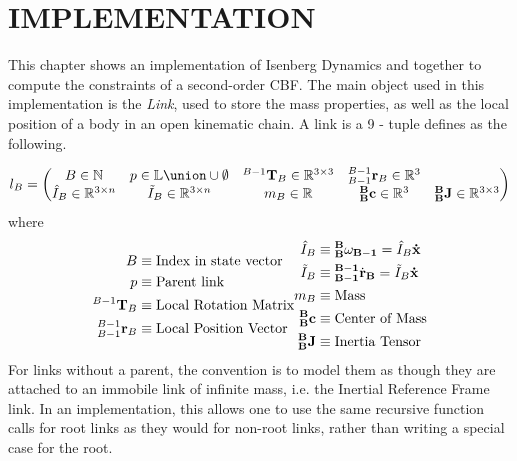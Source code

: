 \chapter{IMPLEMENTATION} \label{chap:implementation}

This chapter shows an implementation of Isenberg Dynamics and \algname{} together to compute the constraints of a second-order CBF. The main object used in this implementation is the \textit{Link}, used to store the mass properties, as well as the local position of a body in an open kinematic chain. A link is a 9 - tuple  defines as the following.

\begin{align} \label{eqn:link_tuple}
    l_B = \begin{pmatrix}
        B \in \mathbb{N} & 
        p \in \mathbb{L} \union \cup \emptyset &
        ^{B-1}\T_B \in \mathbb{R}^{3 \times 3} &
        ^{B-1}_{B-1}\r_B \in \mathbb{R}^3 \\
       \IHat_B \in \mathbb{R}^{3 \times n} &
       \ITilde_B \in \mathbb{R}^{3 \times n} &
       m_B \in \mathbb{R} &
       \BB\com \in \mathbb{R}^3 &
       \BB\J \in \mathbb{R}^{3 \times 3} 
    \end{pmatrix}
\end{align}
\noindent where
\begin{align*}
\begin{split}
    B &\equiv \text{Index in state vector} \\
    p &\equiv \text{Parent link} \\
    ^{B-1}\mathbf{T}_B &\equiv \text{Local Rotation Matrix} \\
    ^{B-1}_{B-1}\mathbf{r}_B &\equiv \text{Local Position Vector} \\
\end{split}
\begin{split}
    \hat{I}_B &\equiv {^\mathbf{B}_\mathbf{B}\omega_{\mathbf{B-1}}} = \hat{I}_B{\mathbf{\dot{x}}}  \\
    \Tilde{I}_B &\equiv \mathbf{^{B-1}_{B-1}}\dot{\mathbf{r}}_{\mathbf{B}} = \Tilde{I}_B{\mathbf{\dot{x}}}  \\
    m_B &\equiv \text{Mass} \\
    ^\mathbf{B}_\mathbf{B}\mathbf{c} &\equiv \text{Center of Mass} \\
    ^\mathbf{B}_\mathbf{B}\mathbf{J}&\equiv \text{Inertia Tensor} 
\end{split}
\end{align*}
\noindent For links without a parent, the convention is to model them as though they are attached to an immobile link of infinite mass, i.e. the Inertial Reference Frame link. In an implementation, this allows one to use the same recursive function calls for root links as they would for non-root links, rather than writing a special case for the root.


